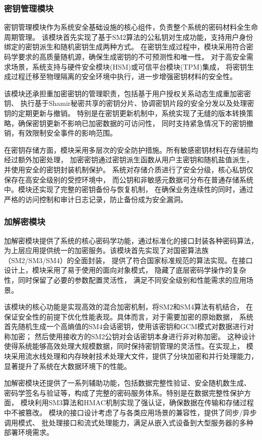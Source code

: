 \subsubsection{密钥管理模块}
密钥管理模块作为系统安全基础设施的核心组件，负责整个系统的密码材料全生命周期管理。
该模块首先实现了基于SM2算法的公私钥对生成功能，支持用户身份绑定的密钥派生和随机密钥生成两种方式。
在密钥生成过程中，模块采用符合密码学要求的高质量随机源，确保生成密钥的不可预测性和唯一性。
对于高安全需求场景，系统支持与硬件安全模块(HSM)或可信平台模块(TPM)集成，
将密钥生成过程迁移至物理隔离的安全环境中执行，进一步增强密钥材料的安全性。

该模块还承担重加密密钥的管理职责，包括基于用户授权关系动态生成重加密密钥、
执行基于Shamir秘密共享的密钥分片、协调密钥片段的安全分发以及处理密钥的定期更新与撤销。
特别是在密钥更新机制中，系统实现了无缝的版本转换策略，确保密钥更新不影响已加密数据的可访问性，
同时支持紧急情况下的密钥撤销，有效限制安全事件的影响范围。

在密钥存储方面，模块采用多层次的安全防护措施。所有敏感密钥材料在存储前均经过额外加密处理，
加密密钥通过密钥派生函数从用户主密钥和随机盐值派生，并使用安全的密钥封装机制保护。
系统对存储介质进行了安全分级，核心私钥仅保存在高安全级别的受控环境中，
而公钥和非敏感元数据可分布在普通存储系统中。模块还实现了完整的密钥备份与恢复机制，
在确保业务连续性的同时，通过严格的访问控制和审计日志记录，防止备份成为安全漏洞。

\subsubsection{加解密模块}
加解密模块提供了系统的核心密码学功能，通过标准化的接口封装各种密码算法，
为上层应用提供统一的加密服务。该模块首先实现了对国密算法族（SM2/SM3/SM4）的全面封装，
提供了符合国家标准规范的算法实现。在接口设计上，模块采用了易于使用的面向对象模式，
隐藏了底层密码学操作的复杂性，同时保留了必要的参数配置灵活性，
满足不同安全级别和性能需求的应用场景。

该模块的核心功能是实现高效的混合加密机制，将SM2和SM4算法有机结合，
在保证安全性的前提下优化性能表现。具体而言，对于需要加密的原始数据，
系统首先随机生成一个高熵值的SM4会话密钥，使用该密钥和GCM模式对数据进行对称加密；
然后使用接收方的SM2公钥对会话密钥本身进行非对称加密。
这种设计使得系统能够高效处理大规模数据，同时保持密钥管理的灵活性。在实现上，
模块采用流水线处理和内存映射技术处理大文件，提供了分块加密和并行处理能力，
显著提升了系统在大数据环境下的性能。

加解密模块还提供了一系列辅助功能，包括数据完整性验证、安全随机数生成、
密码学签名与验证等，构成了完整的密码服务体系。特别是在数据完整性保护方面，
模块利用SM3算法和HMAC机制实现了强认证，确保数据在传输和存储过程中不被篡改。
模块的接口设计考虑了与各类应用场景的兼容性，提供了同步/异步调用模式、
批处理接口和流式处理能力，满足从嵌入式设备到大型服务器的多种部署环境需求。

